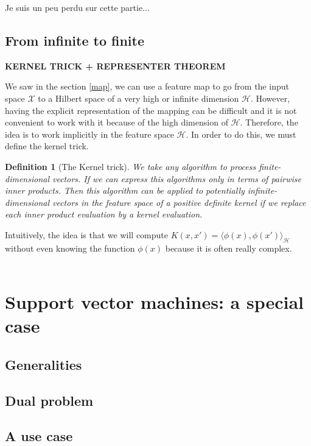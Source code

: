 \documentclass[a4paper, 11pt]{article}
\newtheorem{definition}{Definition}
\begin{document}
{\color{red} Je suis un peu perdu sur cette partie... }

\subsection{From infinite to finite}

{\bf \color{red} KERNEL TRICK + REPRESENTER THEOREM}

We saw in the section \ref{map}, we can use a feature map to go from the input space $\mathcal{X}$ to a Hilbert space of a very high or infinite dimension $\mathcal{H}$. However, having the explicit representation of the mapping can be difficult and it is not convenient to work with it because of the high dimension of $\mathcal{H}$. Therefore, the idea is to work implicitly in the feature space $\mathcal{H}$. In order to do this, we must define the kernel trick.

\begin{definition} [The Kernel trick]
We take any algorithm to process finite-dimensional vectors. If we can express this algorithms only in terms of pairwise inner products. Then this algorithm can be applied to potentially infinite-dimensional vectors in the feature space of a positive definite kernel if we replace each inner product evaluation by a kernel evaluation.
\end{definition}

Intuitively, the idea is that we will compute $K(x,x') = \langle\phi(x),\phi(x')\rangle_{\mathcal{H}}$ without even knowing the function $\phi(x)$ because it is often really complex.
\\\\



\section{Support vector machines: a special case}
\subsection{Generalities}
\subsection{Dual problem}
\subsection{A use case}
\end{document}
